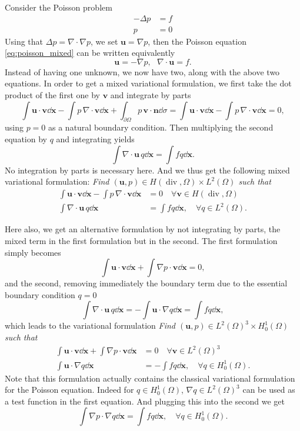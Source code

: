Consider the Poisson problem
\begin{align}
-\Delta p & =f  \label{eq:poisson_mixed}\\
p& =0
\end{align}
Using that $\Delta p = \nabla\cdot\nabla p$, we set $ \mathbf{u}=\nabla p$, then the Poisson equation \eqref{eq:poisson_mixed} can be written equivalently
$$ \mathbf{u}=-\nabla p, ~~~ \nabla\cdot \mathbf{u}= f.$$
Instead of having one unknown, we now have two, along with the above two equations.
In order to get a mixed variational formulation, we first take the dot product of the first one by $ \mathbf{v}$ and integrate by parts
$$\int \mathbf{u}\cdot \mathbf{v}\dd \mathbf{x} -\int p\,\nabla\cdot \mathbf{v}\dd \mathbf{x} +
\int_{\partial\Omega} p \,  \mathbf{v}\cdot \mathbf{n}\dd \sigma=
\int \mathbf{u}\cdot \mathbf{v}\dd \mathbf{x} -\int p\,\nabla\cdot \mathbf{v}\dd \mathbf{x}=0,$$
using $p=0$ as a natural boundary condition. Then multiplying the second equation by $q$ and integrating yields
$$\int \nabla\cdot\mathbf{u} \, q \dd \mathbf{x} = \int f q \dd \mathbf{x}.
$$
No integration by parts is necessary here. And we thus get the following mixed variational formulation:
{\em Find $(\mathbf{u},p) \in H(\operatorname{div},\Omega)\times L^2(\Omega)$ such that}
\begin{align}
\int \mathbf{u}\cdot \mathbf{v}\dd \mathbf{x} -\int p\,\nabla\cdot \mathbf{v}\dd \mathbf{x}&=0 \quad \forall \mathbf{v}\in H(\operatorname{div},\Omega) \\
\int \nabla\cdot\mathbf{u} \, q \dd \mathbf{x} & = \int f q \dd \mathbf{x}, \quad \forall q\in L^2(\Omega).
\end{align}

Here also, we get an alternative formulation by not integrating by parts, the mixed term in the first formulation but in the second. The first formulation simply becomes
$$\int \mathbf{u}\cdot \mathbf{v}\dd \mathbf{x} +\int \nabla p \cdot \mathbf{v}\dd \mathbf{x}=0,$$
and the second, removing immediately the boundary term due to the essential boundary condition $q=0$
$$\int\nabla \cdot\mathbf{u}  \, q \dd \mathbf{x} =
 -\int  \mathbf{u} \cdot \nabla q  \dd \mathbf{x} =
\int f q \dd \mathbf{x},$$
which leads to the variational formulation
{\em Find $(\mathbf{u},p) \in L^2(\Omega)^3 \times H^1_0(\Omega)$ such that}
\begin{align}
\int \mathbf{u}\cdot \mathbf{v}\dd \mathbf{x} +\int \nabla p \cdot \mathbf{v}\dd \mathbf{x}&=0 \quad \forall \mathbf{v}\in L^2(\Omega)^3 \\
\int  \mathbf{u} \cdot \nabla q  \dd \mathbf{x} & = -\int f q \dd \mathbf{x}, \quad \forall q\in H^1_0(\Omega).
\end{align}
Note that this formulation actually contains the classical variational formulation for the Poisson equation. Indeed for $q\in H^1_0(\Omega)$, $\nabla q \in L^2(\Omega)^3$ can be used as a test function in the first equation. And plugging this into the second we get
$$\int  \nabla p \cdot \nabla q  \dd \mathbf{x}  = \int f q \dd \mathbf{x}, \quad \forall q\in H^1_0(\Omega).$$



